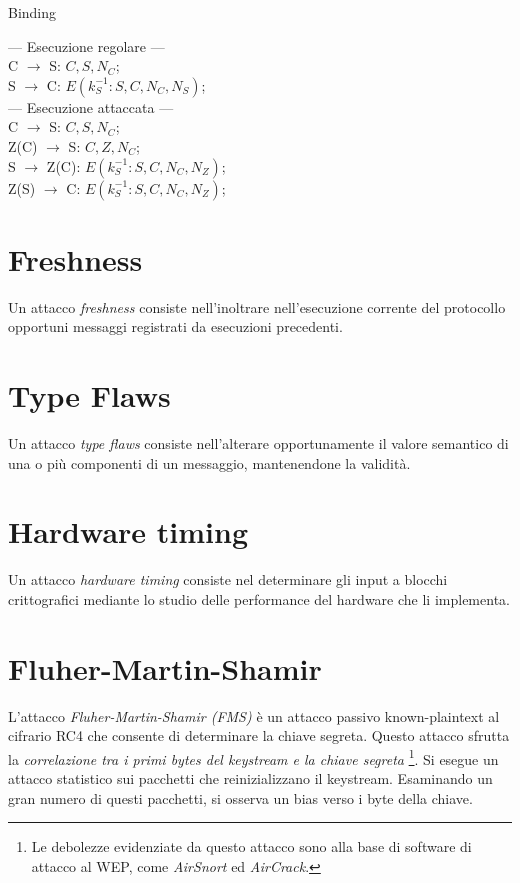 \bigskip
\begin{algorithm}[H]
  \caption{Binding}
  \label{alg:attack-binding}
  \SetAlgoNoLine
  --- Esecuzione regolare --- \\
  C $\rightarrow$ S: $C,S,N_{C}$;\\
  S $\rightarrow$ C: $E(k_{S}^{-1}:S,C,N_{C},N_{S})$;\\
  --- Esecuzione attaccata --- \\
  C $\rightarrow$ S: $C,S,N_{C}$;\\
  Z(C) $\rightarrow$ S: $C,Z,N_{C}$;\\
  S $\rightarrow$ Z(C): $E(k_{S}^{-1}:S,C,N_{C},N_{Z})$;\\
  Z(S) $\rightarrow$ C: $E(k_{S}^{-1}:S,C,N_{C},N_{Z})$;\\
\end{algorithm}

\section{Freshness}
Un attacco \textit{freshness} consiste nell'inoltrare nell'esecuzione corrente del protocollo opportuni messaggi registrati da esecuzioni precedenti.

\section{Type Flaws}
Un attacco \textit{type flaws} consiste nell'alterare opportunamente  il valore semantico di una o più componenti di un messaggio, mantenendone la validità.

\section{Hardware timing}
Un attacco \textit{hardware timing} consiste nel determinare gli input a blocchi crittografici mediante lo studio delle performance del hardware che li implementa.

\section{Fluher-Martin-Shamir}
L'attacco \textit{Fluher-Martin-Shamir (FMS)} è un attacco passivo known-plaintext al cifrario RC4 che consente di determinare la chiave segreta.
Questo attacco sfrutta la \textit{correlazione tra i primi bytes del keystream e la chiave segreta} \footnote{Le debolezze evidenziate da questo attacco sono alla base di software di attacco al WEP, come \textit{AirSnort} ed \textit{AirCrack}.}.
Si esegue un attacco statistico sui pacchetti che reinizializzano il keystream. Esaminando un gran numero di questi pacchetti, si osserva un bias verso i byte della chiave.


